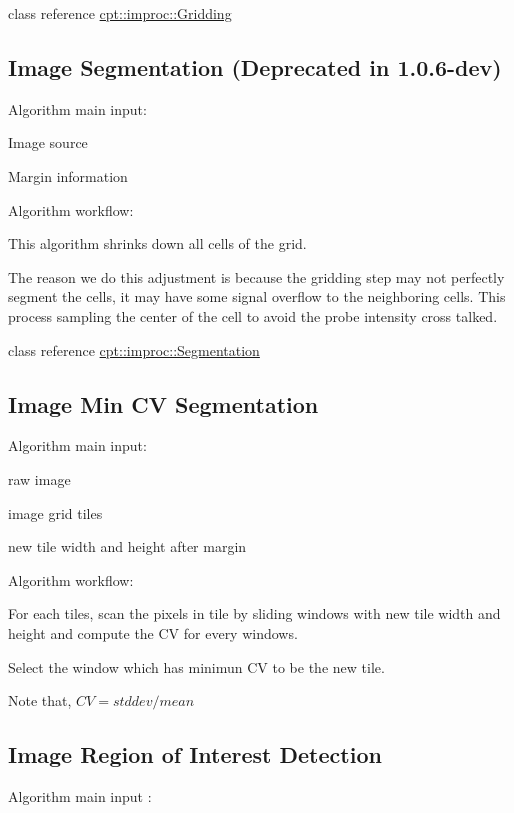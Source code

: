 class reference \hyperlink{structcpt_1_1improc_1_1_gridding}{cpt\-::improc\-::\-Gridding} \hypertarget{improc_segmentation}{}\subsection{Image Segmentation (Deprecated in 1.0.6-\/dev)}\label{improc_segmentation}
Algorithm main input\-:


\begin{DoxyItemize}
\item Image source
\item Margin information
\end{DoxyItemize}

Algorithm workflow\-:

This algorithm shrinks down all cells of the grid.

The reason we do this adjustment is because the gridding step may not perfectly segment the cells, it may have some signal overflow to the neighboring cells. This process sampling the center of the cell to avoid the probe intensity cross talked.

class reference \hyperlink{structcpt_1_1improc_1_1_segmentation}{cpt\-::improc\-::\-Segmentation} \hypertarget{improc_min_cv_auto_margin}{}\subsection{Image Min C\-V Segmentation}\label{improc_min_cv_auto_margin}
Algorithm main input\-:


\begin{DoxyItemize}
\item raw image
\item image grid tiles
\item new tile width and height after margin
\end{DoxyItemize}

Algorithm workflow\-:


\begin{DoxyEnumerate}
\item For each tiles, scan the pixels in tile by sliding windows with new tile width and height and compute the C\-V for every windows.
\item Select the window which has minimun C\-V to be the new tile.
\end{DoxyEnumerate}

Note that, $ CV = stddev / mean $ \hypertarget{improc_r_o_i_detection}{}\subsection{Image Region of Interest Detection}\label{improc_r_o_i_detection}
Algorithm main input \-:


